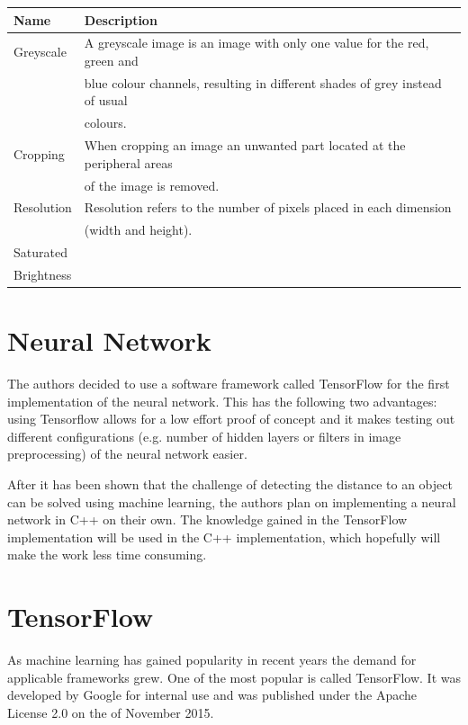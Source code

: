 \begin{table}[h!]
	\begin{tabular}{|l|l|}
		\hline
		\bfseries Name & \bfseries Description \\
		\hline
		Greyscale & A greyscale image is an image with only one value for the red, green and \\
		& blue colour channels, resulting in different shades of grey instead of usual \\
		& colours. \\
		\hline
		Cropping & When cropping an image an unwanted part located at the peripheral areas \\
		& of the image is removed. \\
		\hline
		Resolution & Resolution refers to the number of pixels placed in each dimension \\
		& (width and height). \\
		\hline
		Saturated & \\
		\hline
		Brightness & \\
		\hline
	\end{tabular}
\end{table}

\section{Neural Network}
The authors decided to use a software framework called TensorFlow for the first implementation of the neural network. This has the following two advantages: using Tensorflow allows for a low effort proof of concept and it makes testing out different configurations (e.g. number of hidden layers or filters in image preprocessing) of the neural network easier.

After it has been shown that the challenge of detecting the distance to an object can be solved using machine learning, the authors plan on implementing a neural network in C++ on their own. The knowledge gained in the TensorFlow implementation will be used in the C++ implementation, which hopefully will make the work less time consuming.

\section{TensorFlow}
As machine learning has gained popularity in recent years the demand for applicable frameworks grew. One of the most popular is called TensorFlow. It was developed by Google for internal use and was published under the Apache License 2.0 on the  of November 2015.

